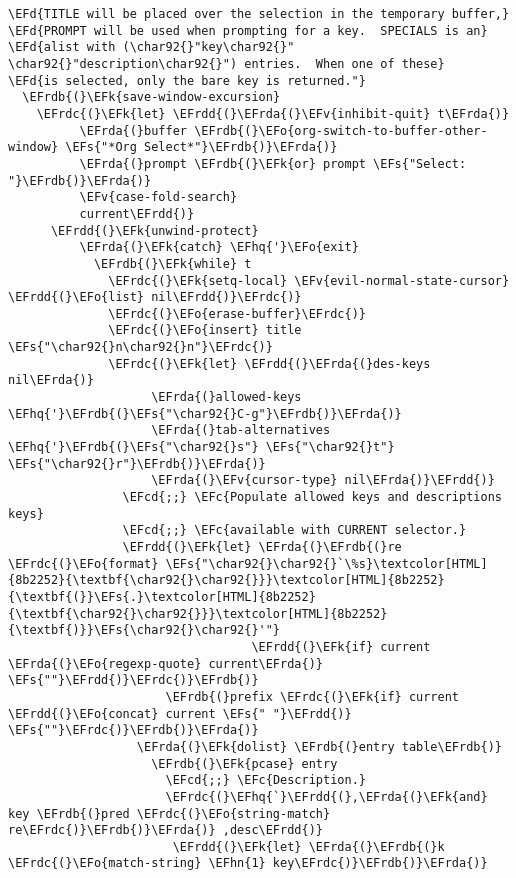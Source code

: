 \documentclass[c]{article}
\theoremstyle{plain}%
\theoremstyle{definition}
\theoremstyle{remark}
\newcommand{\EFc}[1]{\textcolor{EFc}{#1}} %
\newcommand{\EFcd}[1]{\textcolor{EFcd}{#1}} %
\newcommand{\EFs}[1]{\textcolor{EFs}{#1}} %
\newcommand{\EFd}[1]{\textcolor{EFd}{#1}} %
\newcommand{\EFk}[1]{\textcolor{EFk}{#1}} %
\newcommand{\EFv}[1]{\textcolor{EFv}{#1}} %
\newcommand{\EFo}[1]{\textcolor{EFo}{#1}} %
\newcommand{\EFhn}[1]{\textcolor{EFhn}{\textbf{#1}}} %
\newcommand{\EFhq}[1]{\textcolor{EFhq}{#1}} %
\newcommand{\EFrda}[1]{\textcolor{EFrda}{#1}} %
\newcommand{\EFrdb}[1]{\textcolor{EFrdb}{#1}} %
\newcommand{\EFrdc}[1]{\textcolor{EFrdc}{#1}} %
\newcommand{\EFrdd}[1]{\textcolor{EFrdd}{#1}} %
\begin{document}
\begin{Code}
\begin{Verbatim}
\EFd{TITLE will be placed over the selection in the temporary buffer,}
\EFd{PROMPT will be used when prompting for a key.  SPECIALS is an}
\EFd{alist with (\char92{}"key\char92{}" \char92{}"description\char92{}") entries.  When one of these}
\EFd{is selected, only the bare key is returned."}
  \EFrdb{(}\EFk{save-window-excursion}
    \EFrdc{(}\EFk{let} \EFrdd{(}\EFrda{(}\EFv{inhibit-quit} t\EFrda{)}
          \EFrda{(}buffer \EFrdb{(}\EFo{org-switch-to-buffer-other-window} \EFs{"*Org Select*"}\EFrdb{)}\EFrda{)}
          \EFrda{(}prompt \EFrdb{(}\EFk{or} prompt \EFs{"Select: "}\EFrdb{)}\EFrda{)}
          \EFv{case-fold-search}
          current\EFrdd{)}
      \EFrdd{(}\EFk{unwind-protect}
          \EFrda{(}\EFk{catch} \EFhq{'}\EFo{exit}
            \EFrdb{(}\EFk{while} t
              \EFrdc{(}\EFk{setq-local} \EFv{evil-normal-state-cursor} \EFrdd{(}\EFo{list} nil\EFrdd{)}\EFrdc{)}
              \EFrdc{(}\EFo{erase-buffer}\EFrdc{)}
              \EFrdc{(}\EFo{insert} title \EFs{"\char92{}n\char92{}n"}\EFrdc{)}
              \EFrdc{(}\EFk{let} \EFrdd{(}\EFrda{(}des-keys nil\EFrda{)}
                    \EFrda{(}allowed-keys \EFhq{'}\EFrdb{(}\EFs{"\char92{}C-g"}\EFrdb{)}\EFrda{)}
                    \EFrda{(}tab-alternatives \EFhq{'}\EFrdb{(}\EFs{"\char92{}s"} \EFs{"\char92{}t"} \EFs{"\char92{}r"}\EFrdb{)}\EFrda{)}
                    \EFrda{(}\EFv{cursor-type} nil\EFrda{)}\EFrdd{)}
                \EFcd{;;} \EFc{Populate allowed keys and descriptions keys}
                \EFcd{;;} \EFc{available with CURRENT selector.}
                \EFrdd{(}\EFk{let} \EFrda{(}\EFrdb{(}re \EFrdc{(}\EFo{format} \EFs{"\char92{}\char92{}`\%s}\textcolor[HTML]{8b2252}{\textbf{\char92{}\char92{}}}\textcolor[HTML]{8b2252}{\textbf{(}}\EFs{.}\textcolor[HTML]{8b2252}{\textbf{\char92{}\char92{}}}\textcolor[HTML]{8b2252}{\textbf{)}}\EFs{\char92{}\char92{}'"}
                                  \EFrdd{(}\EFk{if} current \EFrda{(}\EFo{regexp-quote} current\EFrda{)} \EFs{""}\EFrdd{)}\EFrdc{)}\EFrdb{)}
                      \EFrdb{(}prefix \EFrdc{(}\EFk{if} current \EFrdd{(}\EFo{concat} current \EFs{" "}\EFrdd{)} \EFs{""}\EFrdc{)}\EFrdb{)}\EFrda{)}
                  \EFrda{(}\EFk{dolist} \EFrdb{(}entry table\EFrdb{)}
                    \EFrdb{(}\EFk{pcase} entry
                      \EFcd{;;} \EFc{Description.}
                      \EFrdc{(}\EFhq{`}\EFrdd{(},\EFrda{(}\EFk{and} key \EFrdb{(}pred \EFrdc{(}\EFo{string-match} re\EFrdc{)}\EFrdb{)}\EFrda{)} ,desc\EFrdd{)}
                       \EFrdd{(}\EFk{let} \EFrda{(}\EFrdb{(}k \EFrdc{(}\EFo{match-string} \EFhn{1} key\EFrdc{)}\EFrdb{)}\EFrda{)}

\end{Verbatim}
\end{Code}
\end{document}
